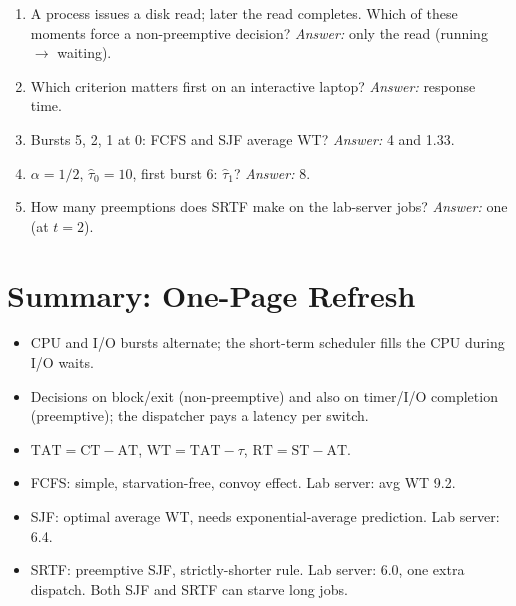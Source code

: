 \documentclass[11pt]{article}
\begin{document}
\begin{enumerate}
  \item A process issues a disk read; later the read completes. Which of these moments force a non-preemptive decision? \emph{Answer:} only the read (running $\to$ waiting).
  \item Which criterion matters first on an interactive laptop? \emph{Answer:} response time.
  \item Bursts 5, 2, 1 at 0: FCFS and SJF average WT? \emph{Answer:} 4 and 1.33.
  \item $\alpha = 1/2$, $\hat{\tau}_0 = 10$, first burst 6: $\hat{\tau}_1$? \emph{Answer:} 8.
  \item How many preemptions does SRTF make on the lab-server jobs? \emph{Answer:} one (at $t=2$).
\end{enumerate}

\section{Summary: One-Page Refresh}

\begin{itemize}
  \item CPU and I/O bursts alternate; the short-term scheduler fills the CPU during I/O waits.
  \item Decisions on block/exit (non-preemptive) and also on timer/I/O completion (preemptive); the dispatcher pays a latency per switch.
  \item $\mathrm{TAT} = \mathrm{CT} - \mathrm{AT}$, $\mathrm{WT} = \mathrm{TAT} - \tau$, $\mathrm{RT} = \mathrm{ST} - \mathrm{AT}$.
  \item FCFS: simple, starvation-free, convoy effect. Lab server: avg WT 9.2.
  \item SJF: optimal average WT, needs exponential-average prediction. Lab server: 6.4.
  \item SRTF: preemptive SJF, strictly-shorter rule. Lab server: 6.0, one extra dispatch. Both SJF and SRTF can starve long jobs.
\end{itemize}
\end{document}
